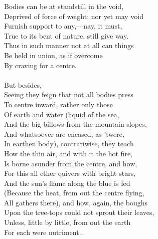 Bodies can be at standstill in the void,\\
Deprived of force of weight; nor yet may void\\
Furnish support to any,—nay, it must,\\
True to its bent of nature, still give way.\\
Thus in such manner not at all can things\\
Be held in union, as if overcome\\
By craving for a centre.\\
\\
But besides,\\
Seeing they feign that not all bodies press\\
To centre inward, rather only those\\
Of earth and water (liquid of the sea,\\
And the big billows from the mountain slopes,\\
And whatsoever are encased, as 'twere,\\
In earthen body), contrariwise, they teach\\
How the thin air, and with it the hot fire,\\
Is borne asunder from the centre, and how,\\
For this all ether quivers with bright stars,\\
And the sun's flame along the blue is fed\\
(Because the heat, from out the centre flying,\\
All gathers there), and how, again, the boughs\\
Upon the tree-tops could not sprout their leaves,\\
Unless, little by little, from out the earth\\
For each were nutriment...

